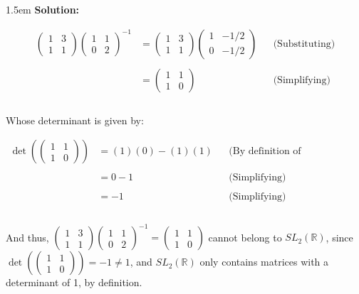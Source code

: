 \documentclass{article}
\newenvironment{solution}{
	\vspace{.5em}
	\par
	\begin{adjustwidth}{1.5em}{}
	\textbf{{Solution:}}
	\par
	\vspace{.5em}
}{
	\vspace{1em}
	\end{adjustwidth}
	\setcounter{step}{0}
}
\newcounter{step}
\begin{document}
\begin{solution}
	\begin{align*}
		\begin{pmatrix}
			1 & 3 \\
			1 & 1
		\end{pmatrix}
		\begin{pmatrix}
			1 & 1 \\
			0 & 2
		\end{pmatrix}^{-1}
		&= \begin{pmatrix}
			1 & 3 \\
			1 & 1
		\end{pmatrix}
		\begin{pmatrix}
			1 & -1/2 \\
			0 & -1/2
		\end{pmatrix}
		&&\text{(Substituting)} \\\\
		&= \begin{pmatrix}
			1 & 1 \\
			1 & 0
		\end{pmatrix}
		&&\text{(Simplifying)} \\\\
	\end{align*}

	Whose determinant is given by:

	\begin{align*}
		\det\left(\begin{pmatrix}
			1 & 1 \\
			1 & 0
		\end{pmatrix}\right)
		&= (1)(0) - (1)(1)  &&\text{(By definition of determinant)} \\\\
		&= 0 - 1 &&\text{(Simplifying)} \\\\
		&= -1 &&\text{(Simplifying)} \\\\
	\end{align*}

	And thus, $\begin{pmatrix} 1 & 3 \\ 1 & 1 \end{pmatrix}\begin{pmatrix} 1 & 1 \\ 0 & 2 \end{pmatrix}^{-1} = \begin{pmatrix} 1 & 1 \\ 1 & 0 \end{pmatrix}$ cannot belong to $SL_{2}(\mathbb{R})$, since $\det\left( \begin{pmatrix} 1 & 1 \\ 1 & 0 \end{pmatrix} \right) = -1 \neq 1$, and $SL_{2}(\mathbb{R})$ only contains matrices with a determinant of 1, by definition. \\


\end{solution}
\end{document}
